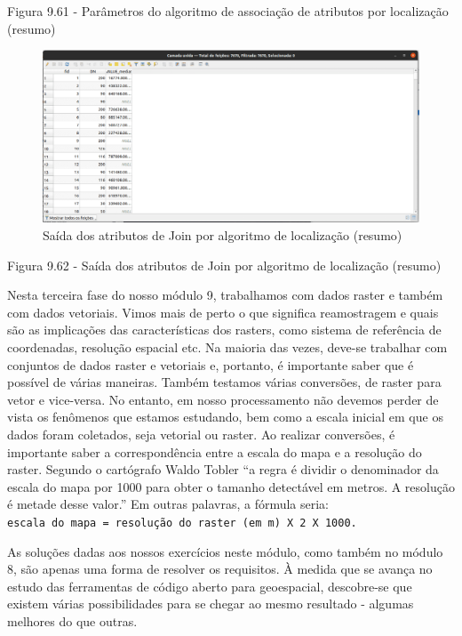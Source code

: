 \documentclass[
]{krantz}
\begin{document}
Figura 9.61 - Parâmetros do algoritmo de associação de atributos por localização (resumo)

\begin{figure}
\centering
\includegraphics{media/modulo9/fig962.png}
\caption{Saída dos atributos de Join por algoritmo de localização (resumo)}
\end{figure}

Figura 9.62 - Saída dos atributos de Join por algoritmo de localização (resumo)

Nesta terceira fase do nosso módulo 9, trabalhamos com dados raster e também com dados vetoriais. Vimos mais de perto o que significa reamostragem e quais são as implicações das características dos rasters, como sistema de referência de coordenadas, resolução espacial etc. Na maioria das vezes, deve-se trabalhar com conjuntos de dados raster e vetoriais e, portanto, é importante saber que é possível de várias maneiras. Também testamos várias conversões, de raster para vetor e vice-versa. No entanto, em nosso processamento não devemos perder de vista os fenômenos que estamos estudando, bem como a escala inicial em que os dados foram coletados, seja vetorial ou raster. Ao realizar conversões, é importante saber a correspondência entre a escala do mapa e a resolução do raster. Segundo o cartógrafo Waldo Tobler ``a regra é dividir o denominador da escala do mapa por 1000 para obter o tamanho detectável em metros. A resolução é metade desse valor.'' Em outras palavras, a fórmula seria: \texttt{escala\ do\ mapa\ =\ resolução\ do\ raster\ (em\ m)\ X\ 2\ X\ 1000.}

As soluções dadas aos nossos exercícios neste módulo, como também no módulo 8, são apenas uma forma de resolver os requisitos. À medida que se avança no estudo das ferramentas de código aberto para geoespacial, descobre-se que existem várias possibilidades para se chegar ao mesmo resultado - algumas melhores do que outras.
\end{document}
